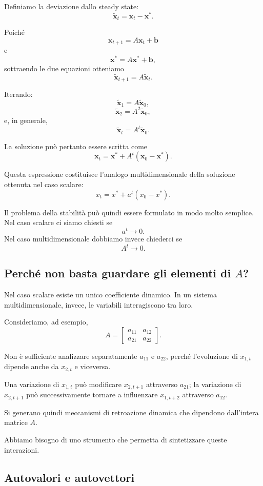 \documentclass{book}
\begin{document}
Definiamo la deviazione dallo steady state:
\[
\widetilde{\mathbf{x}}_t
=
\mathbf{x}_t-\mathbf{x}^*.
\]

Poiché
\[
\mathbf{x}_{t+1}=A\mathbf{x}_t+\mathbf{b}
\]
e
\[
\mathbf{x}^*=A\mathbf{x}^*+\mathbf{b},
\]
sottraendo le due equazioni otteniamo
\[
\widetilde{\mathbf{x}}_{t+1}
=
A\widetilde{\mathbf{x}}_t.
\]

Iterando:
\[
\widetilde{\mathbf{x}}_1
=
A\widetilde{\mathbf{x}}_0,
\]
\[
\widetilde{\mathbf{x}}_2
=
A^2\widetilde{\mathbf{x}}_0,
\]
e, in generale,
\[
\widetilde{\mathbf{x}}_t
=
A^t\widetilde{\mathbf{x}}_0.
\]

La soluzione può pertanto essere scritta come
\[
\mathbf{x}_t
=
\mathbf{x}^*
+
A^t(\mathbf{x}_0-\mathbf{x}^*).
\]

Questa espressione costituisce l'analogo multidimensionale della soluzione
ottenuta nel caso scalare:
\[
x_t=x^*+a^t(x_0-x^*).
\]

Il problema della stabilità può quindi essere formulato in modo molto
semplice. Nel caso scalare ci siamo chiesti se
\[
a^t\rightarrow0.
\]
Nel caso multidimensionale dobbiamo invece chiederci se
\[
A^t\rightarrow0.
\]


\subsection{Perché non basta guardare gli elementi di $A$?}

Nel caso scalare esiste un unico coefficiente dinamico. In un sistema
multidimensionale, invece, le variabili interagiscono tra loro.

Consideriamo, ad esempio,
\[
A=
\begin{bmatrix}
a_{11}&a_{12}\\
a_{21}&a_{22}
\end{bmatrix}.
\]

Non è sufficiente analizzare separatamente $a_{11}$ e $a_{22}$, perché
l'evoluzione di $x_{1,t}$ dipende anche da $x_{2,t}$ e viceversa.

Una variazione di $x_{1,t}$ può modificare $x_{2,t+1}$ attraverso
$a_{21}$; la variazione di $x_{2,t+1}$ può successivamente tornare a
influenzare $x_{1,t+2}$ attraverso $a_{12}$.

Si generano quindi meccanismi di retroazione dinamica che dipendono
dall'intera matrice $A$.

Abbiamo bisogno di uno strumento che permetta di sintetizzare queste
interazioni.


\subsection{Autovalori e autovettori}
\end{document}
